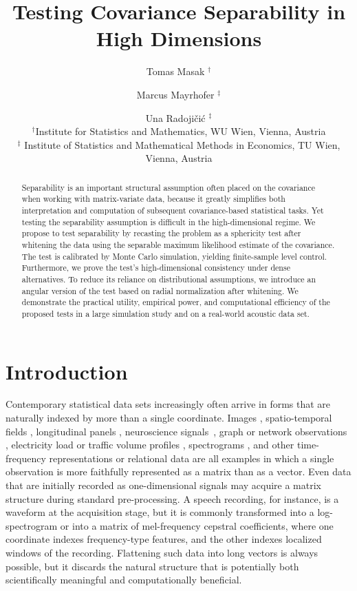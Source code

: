 \documentclass[12pt]{article}
\title{Testing Covariance Separability in High Dimensions}
\author{
Tomas Masak $^{\dagger}$ \and
Marcus Mayrhofer $^{\ddagger}$ \and
Una Radojičić $^{\ddagger}$ \\[0.6em]
\small $^{\dagger}$Institute for Statistics and Mathematics, WU Wien, Vienna, Austria \\
\small $^{\ddagger}$ Institute of Statistics and Mathematical Methods in Economics, TU Wien, Vienna, Austria
}
\begin{document}
\maketitle

\begin{abstract}
Separability is an important structural assumption often placed on the covariance when working with matrix-variate data, because it greatly simplifies both interpretation and computation of subsequent covariance-based statistical tasks. Yet testing the separability assumption is difficult in the high-dimensional regime. We propose to test separability by recasting the problem as a sphericity test after whitening the data using the separable maximum likelihood estimate of the covariance. The test is calibrated by Monte Carlo simulation, yielding finite-sample level control. Furthermore, we prove the test's high-dimensional consistency under dense alternatives. To reduce its reliance on distributional assumptions, we introduce an angular version of the test based on radial normalization after whitening. We demonstrate the practical utility, empirical power, and computational efficiency of the proposed tests in a large simulation study and on a real-world acoustic data set.
\end{abstract}


\section{Introduction}

Contemporary statistical data sets increasingly often arrive in forms that are naturally indexed by more than a single coordinate. Images \citep{wu2023}, spatio-temporal fields \citep{gneiting2002}, longitudinal panels \citep{ding2018matrix}, neuroscience signals~\citep{masak2023separable}, graph or network observations \citep{zhouGemini}, electricity load or traffic volume profiles \citep{bouveyron2018,chiou2014}, spectrograms \citep{pigoli2018statistical}, and other time-frequency representations or relational data \citep{volfovsky2015} are all examples in which a single observation is more faithfully represented as a matrix than as a vector. Even data that are initially recorded as one-dimensional signals may acquire a matrix structure during standard pre-processing. A speech recording, for instance, is a waveform at the acquisition stage, but it is commonly transformed into a log-spectrogram or into a matrix of mel-frequency cepstral coefficients, where one coordinate indexes frequency-type features, and the other indexes localized windows of the recording.
Flattening such data into long vectors is always possible, but it discards the natural structure that is potentially both scientifically meaningful and computationally beneficial.
\end{document}
